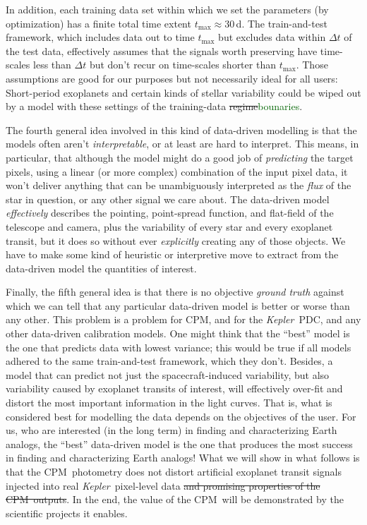 \documentclass[12pt, preprint]{aastex}
\newcommand{\project}[1]{\textsl{#1}}
\newcommand{\Kepler}{\project{Kepler}}
\newcommand{\name}{CPM}
\newcommand{\revise}[1]{\textcolor{darkgreen}{#1}}
\newcommand{\remove}[1]{\sout{#1}}
\begin{document}
In addition, 
  each training data set within which we set the parameters (by optimization) has a finite total time extent $t_{\max}\approx 30$\,d.
The train-and-test framework, which includes data out to time $t_{\max}$ but excludes data within $\Delta t$ of the test data,
  effectively assumes that the signals worth preserving have time-scales less than $\Delta t$ 
  but don't recur on time-scales shorter than $t_{\max}$.
Those assumptions are good for our purposes but not necessarily ideal for all users:
Short-period exoplanets and certain kinds of stellar variability
  could be wiped out by a model with these settings of the training-data \remove{regime}\revise{bounaries}.

The fourth general idea involved in this kind of data-driven modelling is that the models often aren't \emph{interpretable}, 
  or at least are hard to interpret.
This means, in particular, that although the model might do a good job of \emph{predicting} the target pixels,
  using a linear (or more complex) combination of the input pixel data,
  it won't deliver anything that can be unambiguously interpreted as the \emph{flux} of the star in question,
  or any other signal we care about.
The data-driven model \emph{effectively} describes the pointing, point-spread function, and flat-field
  of the telescope and camera,
  plus the variability of every star and every exoplanet transit,
  but it does so without ever \emph{explicitly} creating any of those objects.
We have to make some kind of heuristic or interpretive move to extract from the data-driven model the quantities of interest.

Finally, the fifth general idea is that there is no objective \emph{ground truth} against which we can tell
  that any particular data-driven model is better or worse than any other.
This problem is a problem for \name, and for the \Kepler\ PDC, and any other data-driven calibration models.
One might think that the ``best'' model is the one that predicts data with lowest variance;
  this would be true if all models adhered to the same train-and-test framework, which they don't.
Besides, a model that can predict not just the spacecraft-induced variability,
  but also variability caused by exoplanet transits of interest, will effectively over-fit and distort the most important information in the light curves.
That is, what is considered best for modelling the data depends on the objectives of the user.
For us, who are interested (in the long term) in finding and characterizing Earth analogs,
  the ``best'' data-driven model is the one that produces the most success in finding and characterizing Earth analogs!
What we will show in what follows is that the \name\ photometry does not distort
  artificial exoplanet transit signals injected into real \Kepler\ pixel-level data
  \remove{and promising properties of the \name\ outputs}.
In the end, the value of the \name\ will be demonstrated by the scientific projects it enables.
\end{document}
